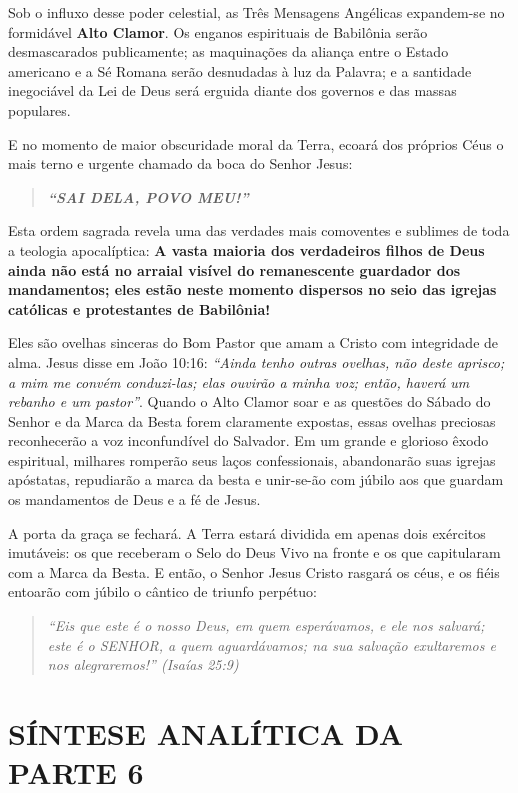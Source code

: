 \documentclass[11pt,a4paper,openany]{book}
\begin{document}
Sob o influxo desse poder celestial, as Três Mensagens Angélicas expandem-se no formidável \textbf{Alto Clamor}. Os enganos espirituais de Babilônia serão desmascarados publicamente; as maquinações da aliança entre o Estado americano e a Sé Romana serão desnudadas à luz da Palavra; e a santidade inegociável da Lei de Deus será erguida diante dos governos e das massas populares.

E no momento de maior obscuridade moral da Terra, ecoará dos próprios Céus o mais terno e urgente chamado da boca do Senhor Jesus:


\begin{quote}
\itshape \textbf{``SAI DELA, POVO MEU!''}
\end{quote}


Esta ordem sagrada revela uma das verdades mais comoventes e sublimes de toda a teologia apocalíptica: \textbf{A vasta maioria dos verdadeiros filhos de Deus ainda não está no arraial visível do remanescente guardador dos mandamentos; eles estão neste momento dispersos no seio das igrejas católicas e protestantes de Babilônia!}

Eles são ovelhas sinceras do Bom Pastor que amam a Cristo com integridade de alma. Jesus disse em João 10:16: \textit{``Ainda tenho outras ovelhas, não deste aprisco; a mim me convém conduzi-las; elas ouvirão a minha voz; então, haverá um rebanho e um pastor''}. Quando o Alto Clamor soar e as questões do Sábado do Senhor e da Marca da Besta forem claramente expostas, essas ovelhas preciosas reconhecerão a voz inconfundível do Salvador. Em um grande e glorioso êxodo espiritual, milhares romperão seus laços confessionais, abandonarão suas igrejas apóstatas, repudiarão a marca da besta e unir-se-ão com júbilo aos que guardam os mandamentos de Deus e a fé de Jesus.

A porta da graça se fechará. A Terra estará dividida em apenas dois exércitos imutáveis: os que receberam o Selo do Deus Vivo na fronte e os que capitularam com a Marca da Besta. E então, o Senhor Jesus Cristo rasgará os céus, e os fiéis entoarão com júbilo o cântico de triunfo perpétuo:


\begin{quote}
\itshape \textit{``Eis que este é o nosso Deus, em quem esperávamos, e ele nos salvará; este é o SENHOR, a quem aguardávamos; na sua salvação exultaremos e nos alegraremos!''} (Isaías 25:9)
\end{quote}




\section{SÍNTESE ANALÍTICA DA PARTE 6}
\end{document}
